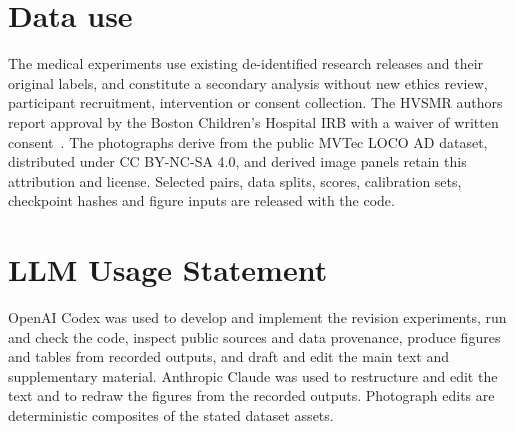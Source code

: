 \documentclass[10pt,twocolumn,letterpaper]{article}
\begin{document}
\section{Data use}
The medical experiments use existing de-identified research releases and their original labels, and constitute a secondary analysis without new ethics review, participant recruitment, intervention or consent collection. The HVSMR authors report approval by the Boston Children's Hospital IRB with a waiver of written consent~\cite{pace2024}. The photographs derive from the public MVTec LOCO AD dataset, distributed under CC BY-NC-SA 4.0, and derived image panels retain this attribution and license. Selected pairs, data splits, scores, calibration sets, checkpoint hashes and figure inputs are released with the code.

\section*{LLM Usage Statement}
OpenAI Codex was used to develop and implement the revision experiments, run and check the code, inspect public sources and data provenance, produce figures and tables from recorded outputs, and draft and edit the main text and supplementary material. Anthropic Claude was used to restructure and edit the text and to redraw the figures from the recorded outputs. Photograph edits are deterministic composites of the stated dataset assets.

{\small


}
\end{document}
